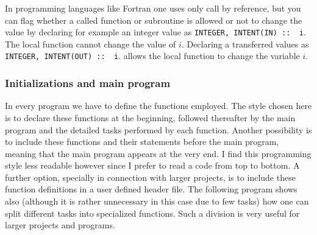 In programming languages like Fortran one uses only call by reference, but you can flag
whether a called function or subroutine is allowed or not to change the value by declaring
for example an integer value as \verb?INTEGER, INTENT(IN) ::  i?.  The local function 
cannot change the value of $i$.  Declaring  a transferred values as \verb?INTEGER, INTENT(OUT) ::  i?.
allows the local function to change the variable $i$.


\subsubsection{Initializations and main program}

In every program we have to define the functions employed. The style chosen
here is to declare these functions at the beginning, followed thereafter 
by the main program and the detailed tasks performed by each function.
Another possibility is to include these functions and their statements 
before the main program, meaning that the main program appears at the very end.
I find this programming style less readable however since I prefer to read a code from top to bottom.
A further option, specially in connection with larger projects,
is to include these function definitions in a user defined header file.
The following program shows also (although it is rather unnecessary in this case due to few tasks)
how one can split different tasks into specialized functions. Such a division is very useful for 
larger projects and programs. 


